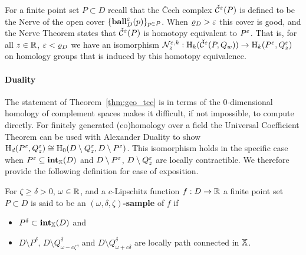 
For a finite point set $P\subset D$ recall that the \v Cech complex $\check{\mathcal{C}}^\varepsilon(P)$ is defined to be the Nerve of the open cover $\{\mathbf{ball}_D^\varepsilon(p)\}_{p\in P}$.
When $\varrho_D > \varepsilon$ this cover is good, and the Nerve Theorem states that $\check{\mathcal{C}}^\varepsilon(P)$ is homotopy equivalent to $P^\varepsilon$.
That is, for all $z\in\mathbb{R}$, $\varepsilon < \varrho_D$ we have an isomorphism $\mathcal{N}_z^{\varepsilon, k} : \mathrm{H}_k(\check{\mathcal{C}}^\varepsilon(P,Q_w))\to \mathrm{H}_k(P^\varepsilon, Q_z^\varepsilon)$ on homology groups that is induced by this homotopy equivalence.%

\paragraph{Duality}

The statement of Theorem~\ref{thm:geo_tcc} is in terms of the $0$-dimensional homology of complement spaces makes it difficult, if not impossible, to compute directly.
For finitely generated (co)homology over a field the Universal Coefficient Theorem can be used with Alexander Duality to show $\mathrm{H}_d(P^\varepsilon,Q_z^\varepsilon)\cong\mathrm{H}_0(D\setminus Q_z^\varepsilon, D\setminus P^\varepsilon)$.
This isomorphism holds in the specific case when $P^\varepsilon\subseteq \mathbf{int}_{\mathbb{X}}(D)$ and $D\setminus P^\varepsilon$, $D\setminus Q_z^\varepsilon$ are locally contractible.
We therefore provide the following definition for ease of exposition.
\begin{definition}
  For $\zeta\geq \delta > 0$, $\omega\in\mathbb{R}$, and a $c$-Lipschitz function $f: D\to \mathbb{R}$ a finite point set $P\subset D$ is said to be an \textbf{$(\omega, \delta, \zeta)$-sample} of $f$ if \begin{itemize}
    \item $P^\delta\subset\mathbf{int}_{\mathbb{X}}(D)$ and
    \item $D\setminus P^\delta$, $D\setminus Q_{\omega-c\zeta}^\delta$, and $D\setminus Q_{\omega+c\delta}^\delta$ are locally path connected in $\mathbb{X}$.
  \end{itemize}
\end{definition}

